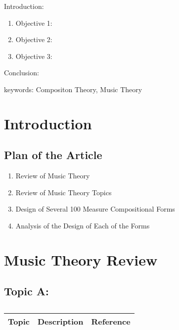


\twocolumn
\scriptsize
\begin{frontmatter}
		\title{}
		\author{}
		\address{The Mathematical Learning Space}
\end{frontmatter}	

Introduction:
\begin{enumerate}
\item Objective 1:
\item Objective 2:
\item Objective 3:
\end{enumerate}
Conclusion:

keywords: Compositon Theory, Music Theory

\section{Introduction}


\subsection{Plan of the Article}

\begin{enumerate}
\item Review of Music Theory
\item Review of Music Theory Topics
\item Design of Several 100 Measure Compositional Forms
\item Analysis of the Design of Each of the Forms
\end{enumerate}

\section{Music Theory Review}

\subsection{Topic A:}

\centering	
\begin{table}[H]\tiny
	\caption{}	
	\begin{tabular}{r|p{4cm}|l}
		\hline	
		Topic & Description & Reference \\
		\hline 
		\hline 
	\end{tabular}
\end{table}

